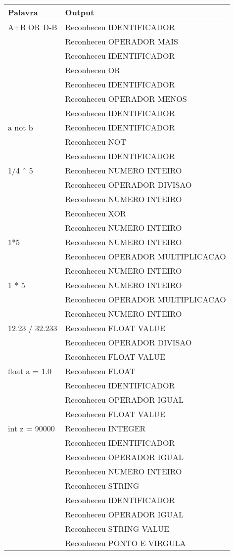 \documentclass[
	article,			%
	11pt,				%
	oneside,			%
	a4paper,			%
	portuguese,			%
	brazil,				%
	sumario=tradicional
	]{abntex2}
\begin{document}
\begin{center}
\begin{table}[H]
\begin{tabularx}{1\textwidth}{p{5cm}|X}
Palavra & Output \\
\hline
A+B OR D-B & Reconheceu IDENTIFICADOR \\
\multirow{6}{*}{}& Reconheceu OPERADOR MAIS \\
& Reconheceu IDENTIFICADOR \\
& Reconheceu OR \\
& Reconheceu IDENTIFICADOR \\
& Reconheceu OPERADOR MENOS \\
& Reconheceu IDENTIFICADOR \\
a not b & Reconheceu IDENTIFICADOR \\
\multirow{2}{*}{} & Reconheceu NOT \\
 & Reconheceu IDENTIFICADOR \\
1/4 {\^\ } 5 & Reconheceu NUMERO INTEIRO \\
\multirow{4}{*}{}& Reconheceu OPERADOR DIVISAO \\ 
& Reconheceu NUMERO INTEIRO \\
& Reconheceu XOR \\
& Reconheceu NUMERO INTEIRO \\ 
1*5 & Reconheceu NUMERO INTEIRO \\
\multirow{2}{*}{}&Reconheceu OPERADOR MULTIPLICACAO \\
& Reconheceu NUMERO INTEIRO \\
1 * 5 & Reconheceu NUMERO INTEIRO \\
\multirow{2}{*}{}&Reconheceu OPERADOR MULTIPLICACAO \\
& Reconheceu NUMERO INTEIRO \\
12.23 / 32.233 & Reconheceu FLOAT VALUE \\
\multirow{2}{*}{}& Reconheceu OPERADOR DIVISAO \\ 
& Reconheceu FLOAT VALUE \\
float a = 1.0 & Reconheceu FLOAT \\
\multirow{3}{*}{}& Reconheceu IDENTIFICADOR \\
& Reconheceu OPERADOR IGUAL \\
& Reconheceu FLOAT VALUE \\
int z = 90000 & Reconheceu INTEGER \\
\multirow{4}{*}{}& Reconheceu IDENTIFICADOR \\
& Reconheceu OPERADOR IGUAL \\
& Reconheceu NUMERO INTEIRO \\ 
string Vegeta = "Over 9 Thousand"; & Reconheceu STRING \\
\multirow{5}{*}{}& Reconheceu IDENTIFICADOR \\
& Reconheceu OPERADOR IGUAL \\
& Reconheceu STRING VALUE \\
& Reconheceu PONTO E VIRGULA \\ \hline
\end{tabularx}
\end{table}
\end{center}
\end{document}
